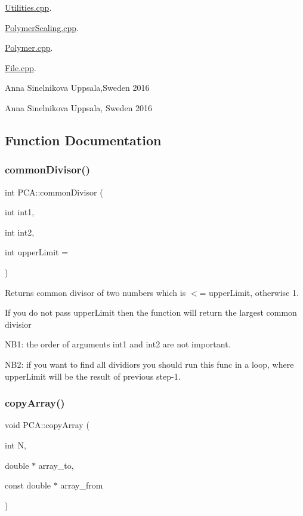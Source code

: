 \hyperlink{_utilities_8cpp}{Utilities.\+cpp}.

\hyperlink{_polymer_scaling_8cpp}{Polymer\+Scaling.\+cpp}.

\hyperlink{_polymer_8cpp}{Polymer.\+cpp}.

\hyperlink{_file_8cpp}{File.\+cpp}.

Anna Sinelnikova Uppsala,Sweden 2016

Anna Sinelnikova Uppsala, Sweden 2016 

\subsection{Function Documentation}
\hypertarget{namespace_p_c_a_a13d2c7cbde32faf05da77e81c6396b92}{}\label{namespace_p_c_a_a13d2c7cbde32faf05da77e81c6396b92} 
\subsubsection{\texorpdfstring{common\+Divisor()}{commonDivisor()}}
{\footnotesize\ttfamily int P\+C\+A\+::common\+Divisor (\begin{DoxyParamCaption}\item[{int}]{int1,  }\item[{int}]{int2,  }\item[{int}]{upper\+Limit = {} }\end{DoxyParamCaption})}



Returns common divisor of two numbers which is $<$= upper\+Limit, otherwise 1. 

If you do not pass upper\+Limit then the function will return the largest common divisior

N\+B1\+: the order of arguments int1 and int2 are not important.

N\+B2\+: if you want to find all dividiors you should run this func in a loop, where upper\+Limit will be the result of previous step-\/1. \hypertarget{namespace_p_c_a_ac0ca09771710ce44c06d3f5f4402fd80}{}\label{namespace_p_c_a_ac0ca09771710ce44c06d3f5f4402fd80} 
\subsubsection{\texorpdfstring{copy\+Array()}{copyArray()}}
{\footnotesize\ttfamily void P\+C\+A\+::copy\+Array (\begin{DoxyParamCaption}\item[{int}]{N,  }\item[{double $\ast$}]{array\+\_\+to,  }\item[{const double $\ast$}]{array\+\_\+from }\end{DoxyParamCaption})}



